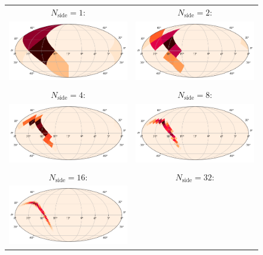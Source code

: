 \begin{colsection}
\begin{colsection}
\begin{figure}[p]
    \begin{center}
        \begin{tabular}{cc}
            $N_\text{side} = 1$: &
            $N_\text{side} = 2$: \\
            \includegraphics[width=0.45\linewidth]{images/regrade/1.png} &
            \includegraphics[width=0.45\linewidth]{images/regrade/2.png} \\
            \\
            $N_\text{side} = 4$: &
            $N_\text{side} = 8$: \\
            \includegraphics[width=0.45\linewidth]{images/regrade/4.png} &
            \includegraphics[width=0.45\linewidth]{images/regrade/8.png} \\
            \\
            $N_\text{side} = 16$: &
            $N_\text{side} = 32$: \\
            \includegraphics[width=0.45\linewidth]{images/regrade/16.png} &

\end{tabular}
\end{center}
\end{figure}
\end{colsection}
\end{colsection}

